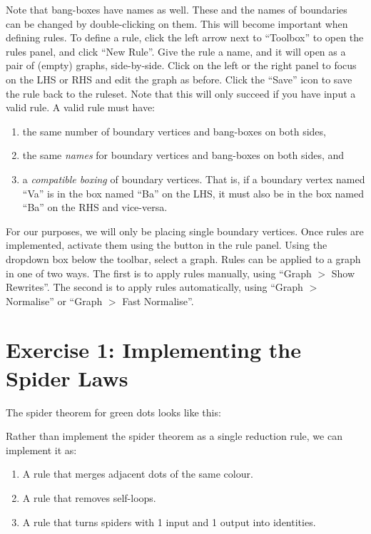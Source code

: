 \documentclass{article}
\begin{document}
Note that bang-boxes have names as well. These and the names of boundaries can be changed by double-clicking on them. This will become important when defining rules. To define a rule, click the left arrow next to ``Toolbox'' to open the rules panel, and click ``New Rule''. Give the rule a name, and it will open as a pair of (empty) graphs, side-by-side. Click on the left or the right panel to focus on the LHS or RHS and edit the graph as before. Click the ``Save'' icon to save the rule back to the ruleset. Note that this will only succeed if you have input a valid rule. A valid rule must have:

\begin{enumerate}
  \item the same number of boundary vertices and bang-boxes on both sides,
  \item the same \textit{names} for boundary vertices and bang-boxes on both sides, and
  \item a \textit{compatible boxing} of boundary vertices. That is, if a boundary vertex named ``Va'' is in the box named ``Ba'' on the LHS, it must also be in the box named ``Ba'' on the RHS and vice-versa.
\end{enumerate}

For our purposes, we will only be placing single boundary vertices. Once rules are implemented, activate them using the button in the rule panel. Using the dropdown box below the toolbar, select a graph. Rules can be applied to a graph in one of two ways. The first is to apply rules manually, using ``Graph $>$ Show Rewrites''. The second is to apply rules automatically, using ``Graph $>$ Normalise'' or ``Graph $>$ Fast Normalise''.


\section*{Exercise 1: Implementing the Spider Laws}

The spider theorem for green dots looks like this:

Rather than implement the spider theorem as a single reduction rule, we can implement it as:

\begin{enumerate}
  \item A rule that merges adjacent dots of the same colour.
  \item A rule that removes self-loops.
  \item A rule that turns spiders with 1 input and 1 output into identities.
\end{enumerate}
\end{document}
